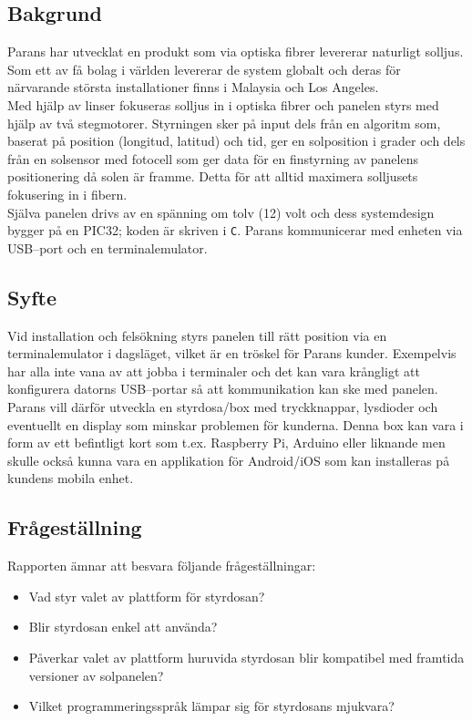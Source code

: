 \documentclass{article}
\begin{document}
        \subsection{Bakgrund} %
        \label{sub:bakgrund}
            Parans har utvecklat en produkt som via optiska fibrer levererar naturligt solljus. Som ett av få bolag i världen levererar de system globalt och deras för närvarande största installationer finns i Malaysia och Los Angeles.\\

            \noindent Med hjälp av linser fokuseras solljus in i optiska fibrer och panelen styrs med hjälp av två stegmotorer. Styrningen sker på input dels från en algoritm som, baserat på position (longitud, latitud) och tid, ger en solposition i grader och dels från en solsensor med fotocell som ger data för en finstyrning av panelens positionering då solen är framme. Detta för att alltid maximera solljusets fokusering in i fibern.\\

            \noindent Själva panelen drivs av en spänning om tolv (12) volt och dess systemdesign bygger på en PIC32; koden är skriven i \texttt{C}. Parans kommunicerar med enheten via USB--port och en terminalemulator. 
        
        \subsection{Syfte} %
        \label{sub:syfte}
            Vid installation och felsökning styrs panelen till rätt position via en terminalemulator i dagsläget, vilket är en tröskel för Parans kunder.  Exempelvis har alla inte vana av att jobba i terminaler och det kan vara krångligt att konfigurera datorns USB--portar så att kommunikation kan ske med panelen. \\

            \noindent Parans vill därför utveckla en styrdosa/box med tryckknappar, lysdioder och eventuellt en display som minskar problemen för kunderna. Denna box kan vara i form av ett befintligt kort som t.ex. Raspberry Pi, Arduino eller liknande men skulle också kunna vara en applikation för Android/iOS som kan installeras på kundens mobila enhet.

        \subsection{Frågeställning} %
        \label{sub:fragestallning}
        Rapporten ämnar att besvara följande frågeställningar:
        \begin{itemize}
            \item Vad styr valet av plattform för styrdosan?
            \item Blir styrdosan enkel att använda?
            \item Påverkar valet av plattform huruvida styrdosan blir kompatibel med framtida versioner av solpanelen?
            \item Vilket programmeringsspråk lämpar sig för styrdosans mjukvara?
        \end{itemize}   
        
\end{document}
